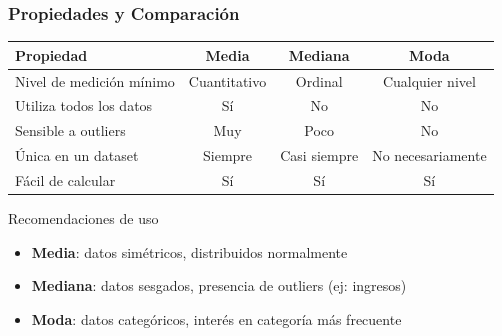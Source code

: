 \documentclass[aspectratio=169,11pt]{beamer}
\begin{document}
\begin{frame}[fragile]
\frametitle{Propiedades y Comparación}

\begin{table}
\small
\begin{tabular}{lccc}
\toprule
\textbf{Propiedad} & \textbf{Media} & \textbf{Mediana} & \textbf{Moda} \\
\midrule
Nivel de medición mínimo & Cuantitativo & Ordinal & Cualquier nivel \\
Utiliza todos los datos & Sí & No & No \\
Sensible a outliers & Muy & Poco & No \\
Única en un dataset & Siempre & Casi siempre & No necesariamente \\
Fácil de calcular & Sí & Sí & Sí \\
\bottomrule
\end{tabular}
\end{table}

\pause

\begin{exampleblock}{Recomendaciones de uso}
  \begin{itemize}
    \item \textbf{Media}: datos simétricos, distribuidos normalmente
    \item \textbf{Mediana}: datos sesgados, presencia de outliers (ej: ingresos)
    \item \textbf{Moda}: datos categóricos, interés en categoría más frecuente
  \end{itemize}
\end{exampleblock}
\end{frame}
\end{document}

